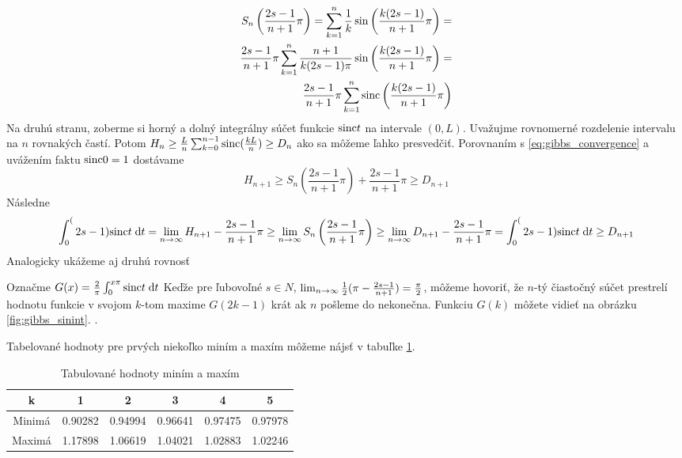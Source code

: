 \begin{dokaz}
    \begin{align}
        S_n\left(\frac{2s-1}{n+1}\pi\right) =
            \sum_{k=1}^n \frac{1}{k}
            \sin\left(\frac{k(2s-1)}{n+1}\pi\right) = \\
         \frac{2s-1}{n+1}\pi    
            \sum_{k=1}^n \frac{n+1}{k(2s-1)\pi}
            \sin\left(\frac{k(2s-1)}{n+1}\pi\right) = \\
         \frac{2s-1}{n+1}\pi    
            \sum_{k=1}^n {\rm sinc}\left( \frac{k(2s-1)}{n+1} \pi \right)            
        \label{eq:gibbs_convergence}
    \end{align}
    Na druhú stranu, zoberme si  horný a dolný
    integrálny súčet funkcie ${\rm sinc} t$ na intervale $(0,L)$.
    Uvažujme rovnomerné rozdelenie intervalu na $n$ rovnakých častí.
    Potom $H_n \ge \frac{L}{n} \sum_{k=0}^{n-1} {\rm sinc}(\frac{k L}{n}) \ge D_n$
    ako sa môžeme ľahko presvedčiť.
    Porovnaním s \ref{eq:gibbs_convergence} a uvážením faktu
    ${\rm sinc} 0 =1$ dostávame
    \begin{equation}
        H_{n+1} \ge S_n\left(\frac{2s-1}{n+1}\pi\right) +
        \frac{2s-1}{n+1}\pi \ge D_{n+1}
    \end{equation}
    Následne
    \begin{equation}
       \int_0^(2s-1) {\rm sinc} t \; \mathrm{d} t = 
       \lim_{n \rightarrow \infty} H_{n+1} - \frac{2s-1}{n+1}\pi \ge 
       \lim_{n \rightarrow \infty} S_n\left(\frac{2s-1}{n+1}\pi\right) \ge
       \lim_{n \rightarrow \infty} D_{n+1} - \frac{2s-1}{n+1}\pi =
       \int_0^(2s-1) {\rm sinc} t \; \mathrm{d} t                     
        \ge D_{n+1}
    \end{equation}
    Analogicky ukážeme aj druhú rovnosť    
\end{dokaz}

Označme $G(x) = \frac{2}{\pi} \int_0^{x \pi} {\rm sinc} t \; \mathrm{d} t$ 
Keďže pre ľubovoľné $s\in N$, $\lim_{n \rightarrow \infty} \frac{1}{2} (\pi -
\frac{2s-1}{n+1} )=\frac{\pi}{2}$, môžeme hovoriť, že
$n$-tý čiastočný súčet prestrelí hodnotu funkcie
v svojom $k$-tom maxime $G(2k-1)$ krát ak
$n$ pošleme do nekonečna.
Funkciu $G(k)$ môžete vidieť na obrázku \ref{fig:gibbs_sinint}.
.


Tabelované hodnoty pre prvých niekoľko miním a maxím môžeme nájsť v
tabuľke \ref{tab:gibbs_table}. 

\begin{table}[htb]
    \centering
    \begin{tabular}{c|c|c|c|c|c|}
        k&1&2&3&4&5 \\ \hline
        Minimá &0.90282&0.94994&0.96641&0.97475&0.97978 \\
        Maximá &1.17898&1.06619&1.04021&1.02883&1.02246
    \end{tabular}
    \caption{Tabulované hodnoty miním a maxím}
    \label{tab:gibbs_table}
\end{table}

